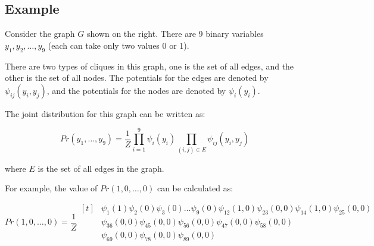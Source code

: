 \documentclass[a4paper]{article}
\begin{document}
\subsection{Example}
\begin{minipage}{0.55\textwidth} 
    Consider the graph $G$ shown on the right. There are 9 binary variables $y_1, y_2, \dots, y_9$ (each can take only two values 0 or 1).  

    There are two types of cliques in this graph, one is the set of all edges, and the other is the set of all nodes. The potentials for the edges are denoted by $\psi_{ij}(y_i, y_j)$, and the potentials for the nodes are denoted by $\psi_i(y_i)$.

    The joint distribution for this graph can be written as:

    \[
    Pr(y_1, \dots, y_9) = \frac{1}{Z} \prod_{i=1}^{9} \psi_i(y_i) \prod_{(i,j) \in E} \psi_{ij}(y_i, y_j)
    \]

    where $E$ is the set of all edges in the graph.

\end{minipage}
\hfill 
\begin{minipage}{0.40\textwidth} 
\end{minipage}


For example, the value of $Pr(1, 0, \dots, 0)$ can be calculated as:

\[
Pr(1, 0, \dots, 0) = \frac{1}{Z} \begin{aligned}[t]
& \psi_1(1) \psi_2(0) \psi_3(0) \dots \psi_9(0) \psi_{12}(1, 0) \psi_{23}(0, 0) \psi_{14}(1, 0) \psi_{25}(0, 0) \\
& \psi_{36}(0, 0) \psi_{45}(0, 0) \psi_{56}(0, 0) \psi_{47}(0, 0) \psi_{58}(0, 0) \\
& \psi_{69}(0, 0) \psi_{78}(0, 0) \psi_{89}(0, 0)
\end{aligned}
\]
\end{document}
